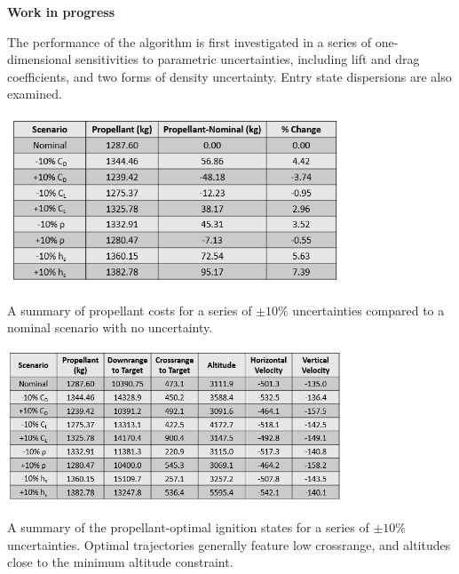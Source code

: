 \documentclass[letterpaper, preprint, paper,11pt]{AAS}
\begin{document}

\textbf{Work in progress}

The performance of the algorithm is first investigated in a series of one-dimensional sensitivities to parametric uncertainties, including lift and drag coefficients, and two forms of density uncertainty. Entry state dispersions are also examined. 

\begin{table}[h!]
	\centering
	\includegraphics[width=0.75\textwidth]{ParametricSensitivityTable} 
	\caption{A summary of propellant costs for a series of $\pm10\%$ uncertainties compared to a nominal scenario with no uncertainty.}
	\label{table_parametric}
\end{table}

\begin{table}[h!]
	\centering
	\includegraphics[width=0.75\textwidth]{ParametricSensitivityIgnitionTable} 
	\caption{A summary of the propellant-optimal ignition states for a series of $\pm10\%$ uncertainties. Optimal trajectories generally feature low crossrange, and altitudes close to the minimum altitude constraint.}
	\label{table_parametric_ignition}
\end{table}

\end{document}
